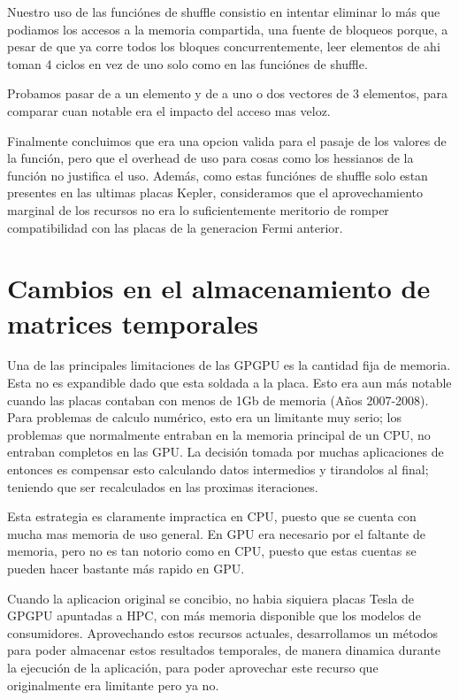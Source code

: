 Nuestro uso de las funci\'ones de shuffle consistio en intentar eliminar lo m\'as que podiamos
los accesos a la memoria compartida, una fuente de bloqueos porque, a pesar de que ya corre
todos los bloques concurrentemente, leer elementos de ahi toman 4 ciclos en vez de uno solo
como en las funci\'ones de shuffle.

Probamos pasar de a un elemento y de a uno o dos vectores de 3 elementos, para comparar
cuan notable era el impacto del acceso mas veloz.

Finalmente concluimos que era una opcion valida para el pasaje de los valores de la funci\'on,
pero que el overhead de uso para cosas como los hessianos de la funci\'on no justifica el uso.
Adem\'as, como estas funci\'ones de shuffle solo estan presentes en las ultimas placas Kepler,
consideramos que el aprovechamiento marginal de los recursos no era lo suficientemente meritorio
de romper compatibilidad con las placas de la generacion Fermi anterior.


\section{Cambios en el almacenamiento de matrices temporales}
Una de las principales limitaciones de las GPGPU es la cantidad fija de memoria. Esta no es
expandible dado que esta soldada a la placa. Esto era aun m\'as notable cuando las placas
contaban con menos de 1Gb de memoria (A\~nos 2007-2008).
Para problemas de calculo num\'erico, esto era un limitante muy serio; los problemas que
normalmente entraban en la memoria principal de un CPU, no entraban completos en las GPU.
La decisi\'on tomada por muchas aplicaciones de entonces es compensar esto calculando
datos intermedios y tirandolos al final; teniendo que ser recalculados en las proximas iteraciones.

Esta estrategia es claramente impractica en CPU, puesto que se cuenta con mucha mas memoria
de uso general. En GPU era necesario por el faltante de memoria, pero no es tan notorio como en CPU,
puesto que estas cuentas se pueden hacer bastante m\'as rapido en GPU.

Cuando la aplicacion original se concibio, no habia siquiera placas Tesla de GPGPU apuntadas a HPC, con
m\'as memoria disponible que los modelos de consumidores. Aprovechando estos recursos actuales,
desarrollamos un m\'etodos para poder almacenar estos resultados temporales, de manera dinamica
durante la ejecuci\'on de la aplicaci\'on, para poder aprovechar este recurso que originalmente
era limitante pero ya no.

